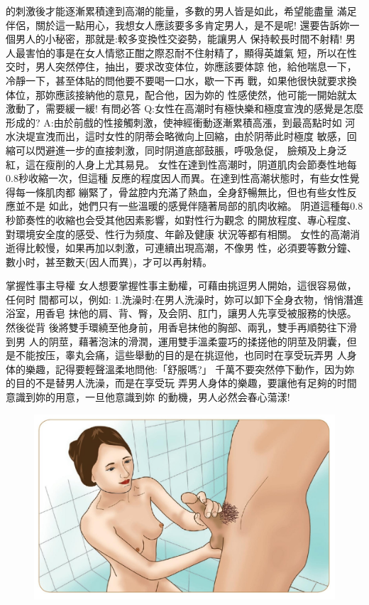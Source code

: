\documentclass[12pt,UTF8]{ctexbook}
\begin{document}
的刺激後才能逐漸累積達到高潮的能量，多數的男人皆是如此，希望能盡量
滿足伴侶，關於這一點用心，我想女人應該要多多肯定男人，是不是呢!
還要告訴妳一個男人的小秘密，那就是:較多变換性交姿勢，能讓男人
保持較長时間不射精!
男人最害怕的事是在女人情慾正酣之際忍耐不住射精了，顯得英雄氣
短，所以在性交时，男人突然停住，抽出，要求改变体位，妳應該要体諒
他，給他喘息一下，冷靜一下，甚至体貼的問他要不要喝一口水，歇一下再
戰，如果他很快就要求換体位，那妳應該接納他的意見，配合他，因为妳的
性感使然，他可能一開始就太激動了，需要緩一緩!
有問必答
Q:女性在高潮时有極快樂和極度宣洩的感覺是怎麼形成的?
A:由於前戲的性接觸刺激，使神經衝動逐漸累積高漲，到最高點时如
河水決堤宣洩而出，這时女性的阴蒂会略微向上回縮，由於阴蒂此时極度
敏感，回縮可以閃避進一步的直接刺激，同时阴道底部鼓脹，呼吸急促，
臉頰及上身泛紅，這在瘦削的人身上尤其易見。
女性在達到性高潮时，阴道肌肉会節奏性地每0.8秒收縮一次，但這種
反應的程度因人而異。在達到性高潮状態时，有些女性覺得每一條肌肉都
繃緊了，骨盆腔内充滿了熱血，全身舒暢無比，但也有些女性反應並不是
如此，她們只有一些溫暖的感覺伴隨著局部的肌肉收縮。
阴道這種每0.8秒節奏性的收縮也会受其他因素影響，如對性行为觀念
的開放程度、專心程度、對環境安全度的感受、性行为频度、年齡及健康
状況等都有相關。
女性的高潮消逝得比較慢，如果再加以刺激，可連續出現高潮，不像男
性，必須要等數分鐘、數小时，甚至數天(因人而異)，才可以再射精。

掌握性事主导權
女人想要掌握性事主動權，可藉由挑逗男人開始，這很容易做，任何时
間都可以，例如:
1.洗澡时:在男人洗澡时，妳可以卸下全身衣物，悄悄潛進浴室，用香皂
抹他的肩、背、臀，及会阴、肛门，讓男人先享受被服務的快感。然後從背
後將雙手環繞至他身前，用香皂抹他的胸部、兩乳，雙手再順勢往下滑到男
人的阴莖，藉著泡沫的滑潤，運用雙手溫柔靈巧的揉搓他的阴莖及阴囊，但
是不能按压，睾丸会痛，這些舉動的目的是在挑逗他，也同时在享受玩弄男
人身体的樂趣，記得要輕聲溫柔地問他:「舒服嗎?」
千萬不要突然停下動作，因为妳的目的不是替男人洗澡，而是在享受玩
弄男人身体的樂趣，要讓他有足夠的时間意識到妳的用意，一旦他意識到妳
的動機，男人必然会春心蕩漾!

\begin{figure}[htbp]
	\centering
	\includegraphics[width=0.7\linewidth]{14}
	\caption{}
	\label{fig:1}
\end{figure}
\end{document}
